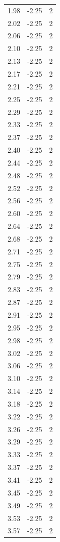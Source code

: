 \begin{longtable}{lrr}
  1.98 & -2.25 & 2 \\
  2.02 & -2.25 & 2 \\
  2.06 & -2.25 & 2 \\
  2.10 & -2.25 & 2 \\
  2.13 & -2.25 & 2 \\
  2.17 & -2.25 & 2 \\
  2.21 & -2.25 & 2 \\
  2.25 & -2.25 & 2 \\
  2.29 & -2.25 & 2 \\
  2.33 & -2.25 & 2 \\
  2.37 & -2.25 & 2 \\
  2.40 & -2.25 & 2 \\
  2.44 & -2.25 & 2 \\
  2.48 & -2.25 & 2 \\
  2.52 & -2.25 & 2 \\
  2.56 & -2.25 & 2 \\
  2.60 & -2.25 & 2 \\
  2.64 & -2.25 & 2 \\
  2.68 & -2.25 & 2 \\
  2.71 & -2.25 & 2 \\
  2.75 & -2.25 & 2 \\
  2.79 & -2.25 & 2 \\
  2.83 & -2.25 & 2 \\
  2.87 & -2.25 & 2 \\
  2.91 & -2.25 & 2 \\
  2.95 & -2.25 & 2 \\
  2.98 & -2.25 & 2 \\
  3.02 & -2.25 & 2 \\
  3.06 & -2.25 & 2 \\
  3.10 & -2.25 & 2 \\
  3.14 & -2.25 & 2 \\
  3.18 & -2.25 & 2 \\
  3.22 & -2.25 & 2 \\
  3.26 & -2.25 & 2 \\
  3.29 & -2.25 & 2 \\
  3.33 & -2.25 & 2 \\
  3.37 & -2.25 & 2 \\
  3.41 & -2.25 & 2 \\
  3.45 & -2.25 & 2 \\
  3.49 & -2.25 & 2 \\
  3.53 & -2.25 & 2 \\
  3.57 & -2.25 & 2 \\

\end{longtable}
